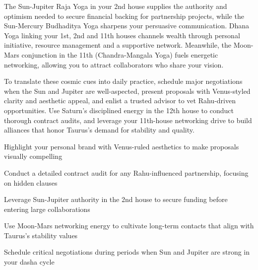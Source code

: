 {\fontsize{9}{13}\selectfont The Sun-Jupiter Raja Yoga in your 2nd house supplies the authority and optimism needed to secure financial backing for partnership projects, while the Sun-Mercury Budhaditya Yoga sharpens your persuasive communication. Dhana Yoga linking your 1st, 2nd and 11th houses channels wealth through personal initiative, resource management and a supportive network. Meanwhile, the Moon-Mars conjunction in the 11th (Chandra-Mangala Yoga) fuels energetic networking, allowing you to attract collaborators who share your vision.}\par\vspace{1.8mm}

{\fontsize{9}{13}\selectfont To translate these cosmic cues into daily practice, schedule major negotiations when the Sun and Jupiter are well-aspected, present proposals with Venus-styled clarity and aesthetic appeal, and enlist a trusted advisor to vet Rahu-driven opportunities. Use Saturn's disciplined energy in the 12th house to conduct thorough contract audits, and leverage your 11th-house networking drive to build alliances that honor Taurus's demand for stability and quality.}\par\vspace{1.8mm}

\begin{diamondlist}
  \item {\fontsize{8.5}{12}\selectfont Highlight your personal brand with Venus-ruled aesthetics to make proposals visually compelling}
  \item {\fontsize{8.5}{12}\selectfont Conduct a detailed contract audit for any Rahu-influenced partnership, focusing on hidden clauses}
  \item {\fontsize{8.5}{12}\selectfont Leverage Sun-Jupiter authority in the 2nd house to secure funding before entering large collaborations}
  \item {\fontsize{8.5}{12}\selectfont Use Moon-Mars networking energy to cultivate long-term contacts that align with Taurus's stability values}
  \item {\fontsize{8.5}{12}\selectfont Schedule critical negotiations during periods when Sun and Jupiter are strong in your dasha cycle}
\end{diamondlist}


\label{topic18}

